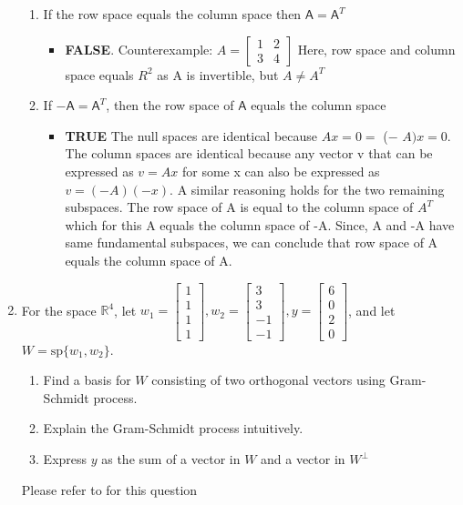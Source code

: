 \documentclass[a4paper, 11pt]{article}
\newcommand{\mat}[1]{\boldsymbol { \mathsf{#1}} }
\newcommand{\MYhref}[3][blue]{\href{#2}{\color{#1}{#3}}}
\begin{document}
\begin{enumerate}
\begin{enumerate}[label=(\alph*)]
\item If the row space equals the column space then $\mat A = \mat A^T$
\begin{itemize}
    \item \textbf{FALSE}. Counterexample: $ A = \begin{bmatrix}
    1 & 2 \\ 3 & 4
    \end{bmatrix}$
    Here, row space and column space equals $R^2$ as A  is invertible, but $A\neq A^T$
\end{itemize}
\item If $-\mat A = \mat A^T$, then the row space of $\mat A$ equals the column space 
\begin{itemize}
    \item \textbf{TRUE}
    The null spaces are identical because $Ax = 0 =$  ($-$ $A)x = 0.$
The column spaces are identical because any vector v that can be expressed
as $v = Ax$ for some x can also be expressed as $v = (−A)(−x)$. A similar
reasoning holds for the two remaining subspaces. The row space of A is equal to the column space of $A^T$ which for this A equals the column space of -A. Since, A and -A have same fundamental subspaces, we can conclude that row space of A equals the column space of A.
    
\end{itemize}
\end{enumerate}



\item For the space $\mathbb R^4$, let $w_1 = \begin{bmatrix} 1 \\ 1 \\ 1 \\ 1\end{bmatrix}, w_2 = \begin{bmatrix} 3 \\ 3 \\ -1 \\ -1\end{bmatrix}, y = \begin{bmatrix} 6 \\ 0 \\ 2 \\ 0\end{bmatrix}$, and let $W = \text{sp}\{w_1, w_2\}$. 

\begin{enumerate}[label=(\alph*)]
\item Find a basis for $W$ consisting of two orthogonal vectors using Gram-Schmidt process.
\item Explain the Gram-Schmidt process intuitively. 
\item Express $y$ as the sum of a vector in $W$ and a vector in $W^\perp$
\end{enumerate}

Please refer to \MYhref{https://textbooks.math.gatech.edu/ila/orthogonal-sets.html}{this link} for this question

\end{enumerate}
\end{document}
